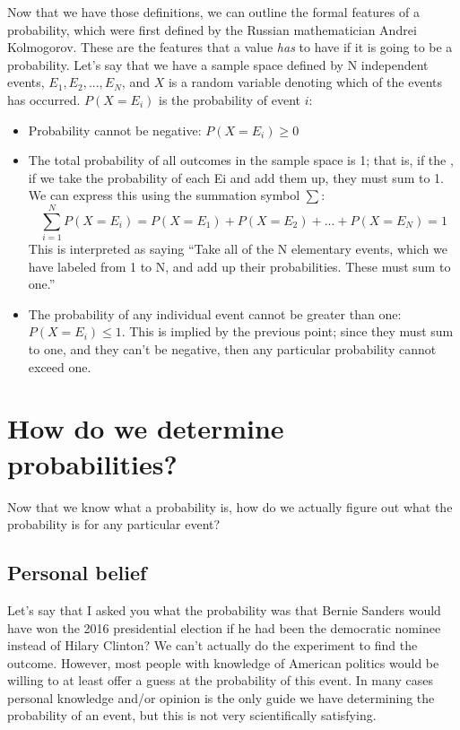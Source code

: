\documentclass[
  12pt,
]{book}
\providecommand{\tightlist}{%
  \setlength{\itemsep}{0pt}\setlength{\parskip}{0pt}}
\begin{document}
Now that we have those definitions, we can outline the formal features of a probability, which were first defined by the Russian mathematician Andrei Kolmogorov. These are the features that a value \emph{has} to have if it is going to be a probability. Let's say that we have a sample space defined by N independent events, \({E_1, E_2, ... , E_N}\), and \(X\) is a random variable denoting which of the events has occurred. \(P(X=E_i)\) is the probability of event \(i\):

\begin{itemize}
\tightlist
\item
  Probability cannot be negative: \(P(X=E_i) \ge 0\)
\item
  The total probability of all outcomes in the sample space is 1; that is, if the , if we take the probability of each Ei and add them up, they must sum to 1. We can express this using the summation symbol \(\sum\):
  \[
  \sum_{i=1}^N{P(X=E_i)} = P(X=E_1) + P(X=E_2) + ... + P(X=E_N) = 1
  \]
  This is interpreted as saying ``Take all of the N elementary events, which we have labeled from 1 to N, and add up their probabilities. These must sum to one.''\\
\item
  The probability of any individual event cannot be greater than one: \(P(X=E_i)\le 1\). This is implied by the previous point; since they must sum to one, and they can't be negative, then any particular probability cannot exceed one.
\end{itemize}

\hypertarget{how-do-we-determine-probabilities}{%
\section{How do we determine probabilities?}\label{how-do-we-determine-probabilities}}

Now that we know what a probability is, how do we actually figure out what the probability is for any particular event?

\hypertarget{personal-belief}{%
\subsection{Personal belief}\label{personal-belief}}

Let's say that I asked you what the probability was that Bernie Sanders would have won the 2016 presidential election if he had been the democratic nominee instead of Hilary Clinton? We can't actually do the experiment to find the outcome. However, most people with knowledge of American politics would be willing to at least offer a guess at the probability of this event. In many cases personal knowledge and/or opinion is the only guide we have determining the probability of an event, but this is not very scientifically satisfying.
\end{document}
